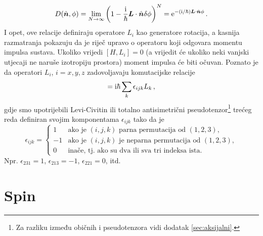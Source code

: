 \begin{equation}
D(\hat{\vec{n}}, \phi)=\lim_{N\to\infty}
\left(1-\frac{\rmi}{\hbar}\vec{L}\cdot\hat{\vec{n}}\delta\phi \right)^N
= \rme^{-(\rmi/\hbar)\vec{L}\cdot\hat{\vec{n}}\phi} \,.
\label{eq:rotD}
\end{equation}
I opet, ove relacije definiraju operatore $L_i$ kao generatore rotacija,
a kasnija razmatranja pokazuju da je riječ upravo o operatoru koji
odgovara momentu impulsa sustava.
Ukoliko vrijedi $[H,L_{i}]=0$ (a vrijedit će ukoliko neki vanjski utjecaji
ne naruše izotropiju prostora) moment impulsa će biti očuvan.
Poznato je da operatori $L_i$, $i=x,y,z$ zadovoljavaju komutacijske relacije
\begin{equation}
    [L_i, L_j] = \rmi\hbar \sum_{k} \epsilon_{ijk}  L_k \,,
    \label{eq:Lkomutacija}
\end{equation}
gdje smo upotrijebili Levi-Civitin ili totalno antisimetrični pseudotenzor\footnote{Za
razliku između običnih i pseudotenzora vidi dodatak \ref{sec:aksijalni}.}
trećeg reda definiran
svojim komponentama $\epsilon_{ijk}$ tako da je
\begin{displaymath}
\epsilon_{ijk}=
\begin{cases}
1& \text{ako je $(i,j,k)$ parna permutacija od $(1,2,3)$}, \\
-1& \text{ako je $(i,j,k)$ je neparna permutacija od $(1,2,3)$}, \\
0& \text{inače, tj. ako su dva ili sva tri indeksa ista}.
\end{cases} 
\end{displaymath}
Npr. $\epsilon_{231}=1$, $\epsilon_{213}=-1$, $\epsilon_{221}=0$, itd.
  

\section{Spin}

